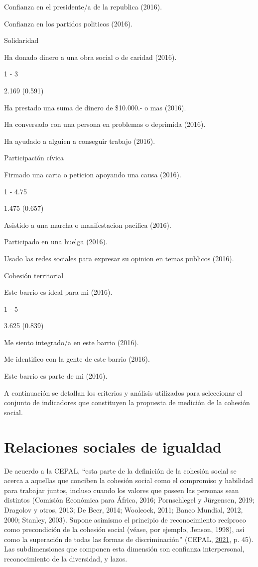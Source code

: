 \documentclass[
  12pt,
]{book}
\begin{document}
Confianza en el presidente/a de la republica (2016).

Confianza en los partidos politicos (2016).

Solidaridad

Ha donado dinero a una obra social o de caridad (2016).

1 - 3

2.169 (0.591)

Ha prestado una suma de dinero de \$10.000.- o mas (2016).

Ha conversado con una persona en problemas o deprimida (2016).

Ha ayudado a alguien a conseguir trabajo (2016).

Participación cívica

Firmado una carta o peticion apoyando una causa (2016).

1 - 4.75

1.475 (0.657)

Asistido a una marcha o manifestacion pacifica (2016).

Participado en una huelga (2016).

Usado las redes sociales para expresar su opinion en temas publicos (2016).

Cohesión territorial

Este barrio es ideal para mi (2016).

1 - 5

3.625 (0.839)

Me siento integrado/a en este barrio (2016).

Me identifico con la gente de este barrio (2016).

Este barrio es parte de mi (2016).

A continuación se detallan los criterios y análisis utilizados para seleccionar el conjunto de indicadores que constituyen la propuesta de medición de la cohesión social.

\hypertarget{relaciones-sociales-de-igualdad}{%
\section{Relaciones sociales de igualdad}\label{relaciones-sociales-de-igualdad}}

De acuerdo a la CEPAL, ``esta parte de la definición de la cohesión social se acerca a aquellas que conciben la cohesión social como el compromiso y habilidad para trabajar juntos, incluso cuando los valores que poseen las personas sean distintos (Comisión Económica para África, 2016; Pornschlegel y Jürgensen, 2019; Dragolov y otros, 2013; De Beer, 2014; Woolcock, 2011; Banco Mundial, 2012, 2000; Stanley, 2003). Supone asimismo el principio de reconocimiento recíproco como precondición de la cohesión social (véase, por ejemplo, Jenson, 1998), así como la superación de todas las formas de discriminación'' (CEPAL, \protect\hyperlink{ref-cepal_cohesion_2021}{2021}, p. 45). Las subdimensiones que componen esta dimensión son confianza interpersonal, reconocimiento de la diversidad, y lazos.
\end{document}
